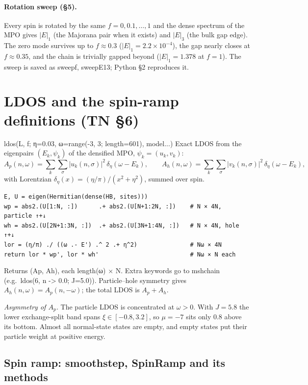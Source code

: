 \documentclass[11pt]{article}
\newcommand{\codeus}{\textunderscore\allowbreak}
\renewcommand{\code}[1]{{\ttfamily\let\_\codeus #1}}
\begin{document}
\paragraph{Rotation sweep (§5).} Every spin is rotated by the same $f=0,0.1,\dots,1$ and the dense spectrum of the MPO gives $|E|_1$ (the Majorana pair when it exists) and $|E|_3$ (the bulk gap edge). The zero mode survives up to $f\approx0.3$ ($|E|_1=2.2\times10^{-4}$), the gap nearly closes at $f\approx0.35$, and the chain is trivially gapped beyond ($|E|_1=1.378$ at $f=1$). The sweep is saved as \code{sweep\_f}, \code{sweep\_E13}; Python §2 reproduces it.

\section{LDOS and the spin-ramp definitions (TN §6)}

\begin{function}{ldos(L, f; η=0.03, ω=range(-3, 3; length=601), model...)}
Exact LDOS from the eigenpairs $(E_k,\psi_k)$ of the densified MPO, $\psi_k=(u_k,v_k)$:
\[
A_p(n,\omega)=\sum_k\sum_\sigma|u_k(n,\sigma)|^2\,\delta_\eta(\omega-E_k),\qquad
A_h(n,\omega)=\sum_k\sum_\sigma|v_k(n,\sigma)|^2\,\delta_\eta(\omega-E_k),
\]
with Lorentzian $\delta_\eta(x)=(\eta/\pi)/(x^2+\eta^2)$, summed over spin.
\begin{Verbatim}
E, U = eigen(Hermitian(dense(HB, sites)))
wp = abs2.(U[1:N, :])      .+ abs2.(U[N+1:2N, :])    # N × 4N, particle ↑+↓
wh = abs2.(U[2N+1:3N, :])  .+ abs2.(U[3N+1:4N, :])   # N × 4N, hole ↑+↓
lor = (η/π) ./ ((ω .- E') .^ 2 .+ η^2)               # Nω × 4N
return lor * wp', lor * wh'                          # Nω × N each
\end{Verbatim}
Returns \code{(A\_p, A\_h)}, each \code{length(ω) × N}. Extra keywords go to \code{msh\_chain} (e.g.\ \code{ldos(6, n -> 0.0; J=5.0)}). Particle–hole symmetry gives $A_h(n,\omega)=A_p(n,-\omega)$; the total LDOS is $A_p+A_h$.

\emph{Asymmetry of $A_p$.} The particle LDOS is concentrated at $\omega>0$. With $J=5.8$ the lower exchange-split band spans $\xi\in[-0.8,3.2]$, so $\mu=-7$ sits only 0.8 above its bottom. Almost all normal-state states are empty, and empty states put their particle weight at positive energy.
\end{function}

\subsection{Spin ramp: \code{smoothstep}, \code{SpinRamp} and its methods}
\end{document}

